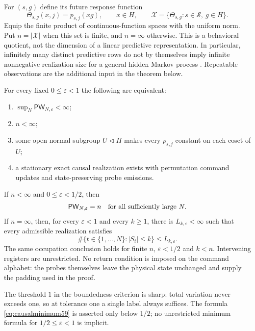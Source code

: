 For $(s,g)$ define its future response function
\begin{equation}\label{eq:futuretype59}
 \Theta_{s,g}(x,j)=p_{s,j}(xg),\qquad x\in H,
 \qquad \mathcal X=\{\Theta_{s,g}:s\in\mathcal S,\ g\in H\}.
\end{equation}
Equip the finite product of continuous-function spaces with the uniform
norm. Put $n=|\mathcal X|$ when this set is finite, and $n=\infty$
otherwise. This is a behavioral quotient, not the dimension of a linear
predictive representation. In particular, infinitely many distinct
predictive rows do not by themselves imply infinite nonnegative
realization size for a general hidden Markov process
\cite[Theorem~2 and Section~4]{SJR2004}. Repeatable observations are the
additional input in the theorem below.

\begin{theorem}
\label{thm:causalclassification59}
For every fixed $0\le\varepsilon<1$ the following are equivalent:
\begin{enumerate}
\item $\sup_N\mathsf{PW}_{N,\varepsilon}<\infty$;
\item $n<\infty$;
\item some open normal subgroup $U\lhd H$ makes every $p_{s,j}$ constant
      on each coset of $U$;
\item a stationary exact causal realization exists with permutation
      command updates and state-preserving probe emissions.
\end{enumerate}
If $n<\infty$ and $0\le\varepsilon<1/2$, then
\begin{equation}\label{eq:causalminimum59}
                   \mathsf{PW}_{N,\varepsilon}=n
                   \quad\hbox{for all sufficiently large }N.
\end{equation}
If $n=\infty$, then, for every $\varepsilon<1$ and every $k\ge1$,
there is $L_{k,\varepsilon}<\infty$ such that every admissible realization
satisfies
\begin{equation}\label{eq:causaloccupation59}
 \#\{t\in\{1,\ldots,N\}:|S_t|\le k\}\le L_{k,\varepsilon}.
\end{equation}
The same occupation conclusion holds for finite $n$, $\varepsilon<1/2$
and $k<n$. Intervening registers are unrestricted. No return condition
is imposed on the command alphabet: the probes themselves leave the
physical state unchanged and supply the padding used in the proof.
\end{theorem}
The threshold $1$ in the boundedness criterion is sharp: total variation
never exceeds one, so at tolerance one a single label always suffices.
The formula \eqref{eq:causalminimum59} is asserted only below $1/2$;
no unrestricted minimum formula for $1/2\le\varepsilon<1$ is implicit.


